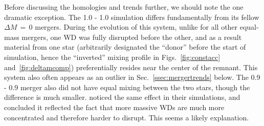 Before discussing the homologies and trends further, we should note the one dramatic exception.  The 1.0 - 1.0 {\Msun} simulation differs fundamentally from its fellow $\Delta M\,=\,0$ mergers.  During the evolution of this system, unlike for all other equal-mass mergers, one WD was fully disrupted before the other, and as a result material from one star (arbitrarily designated the ``donor'' before the start of simulation, hence the ``inverted'' mixing profile in Figs.~\ref{fig:constacc} and~\ref{fig:deltamcomp}) preferentially resides near the center of the remnant.  This system also often appears as an outlier in Sec.~\ref{ssec:mergertrends} below.  The 0.9 - 0.9 {\Msun} merger also did not have equal mixing between the two stars, though the difference is much smaller.  \cite{rask+12} noticed the same effect in their simulations, and concluded it reflected the fact that more massive WDs are much more concentrated and therefore harder to disrupt.  This seems a likely explanation.




